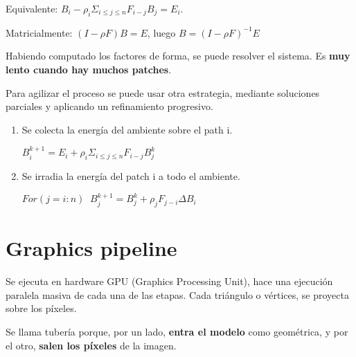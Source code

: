 Equivalente: $B_i - \rho_i \Sigma_{i \leq j \leq n} F_{i-j} B_j=E_i$.

Matricialmente: $(I - \rho F)B=E$, luego $B=(I-\rho F)^{-1} E$

Habiendo computado los factores de forma, se puede resolver el sistema. Es \textbf{muy lento cuando hay muchos patches}.

Para agilizar el proceso se puede usar otra estrategia, mediante soluciones parciales y aplicando un refinamiento progresivo. 
\begin{enumerate}
	\item Se colecta la energía del ambiente sobre el path i.
	      
	      $B_i^{k+1} = E_i + \rho_i \Sigma_{i \leq j \leq n} F_{i-j} B_j^{k}$
	\item Se irradia la energía del patch i a todo el ambiente.
	      
	      $For (j= i:n)\;\; B_j^{k+1} = B_j^{k} + \rho_j F_{j-i} \Delta B_i$
\end{enumerate}
\pagebreak

\section{Graphics pipeline}
Se ejecuta en hardware GPU (Graphics Processing Unit), hace una ejecución paralela masiva de cada una de las etapas. Cada triángulo o vértices, se proyecta sobre los píxeles.

Se llama tubería porque, por un lado, \textbf{entra el modelo} como geométrica, y por el otro, \textbf{salen los píxeles} de la imagen.

